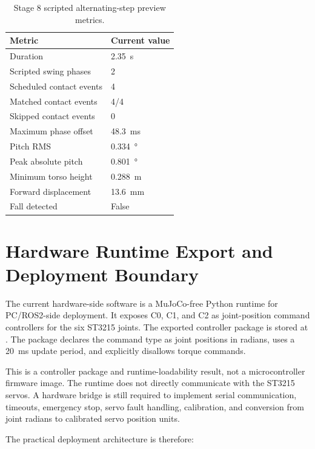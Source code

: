 \begin{table}[htbp]
\centering
\caption{Stage 8 scripted alternating-step preview metrics.}
\label{tab:stage8_preview_metrics_20260708}
\begin{tabular}{@{}ll@{}}
\toprule
Metric & Current value \\
\midrule
Duration & \SI{2.35}{\second} \\
Scripted swing phases & 2 \\
Scheduled contact events & 4 \\
Matched contact events & 4/4 \\
Skipped contact events & 0 \\
Maximum phase offset & \SI{48.3}{\milli\second} \\
Pitch RMS & \SI{0.334}{\degree} \\
Peak absolute pitch & \SI{0.801}{\degree} \\
Minimum torso height & \SI{0.288}{\metre} \\
Forward displacement & \SI{13.6}{\milli\metre} \\
Fall detected & False \\
\bottomrule
\end{tabular}
\end{table}

\section{Hardware Runtime Export and Deployment Boundary}
\label{sec:hardware_runtime_export_20260708}

The current hardware-side software is a MuJoCo-free Python runtime for
PC/ROS2-side deployment. It exposes C0, C1, and C2 as joint-position command
controllers for the six ST3215 joints. The exported controller package is
stored at . The package declares
the command type as joint positions in radians, uses a
\SI{20}{\milli\second} update period, and explicitly disallows torque
commands.

This is a controller package and runtime-loadability result, not a
microcontroller firmware image. The runtime does not directly communicate with
the ST3215 servos. A hardware bridge is still required to implement serial
communication, timeouts, emergency stop, servo fault handling, calibration, and
conversion from joint radians to calibrated servo position units.

The practical deployment architecture is therefore:

